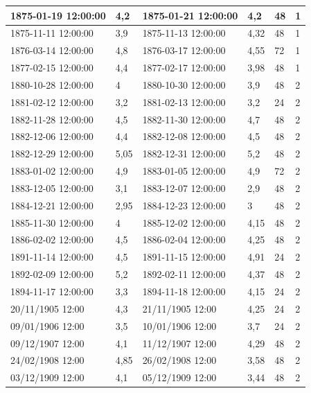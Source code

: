\documentclass[11pt]{article}
\begin{document}
\begin{longtable}{|l|p{2.3cm}|l|p{2.3cm}|l|l|}
        1875-01-19 12:00:00 & 4,2 & 1875-01-21 12:00:00 & 4,2 & 48 & 1 \\ \hline
        1875-11-11 12:00:00 & 3,9 & 1875-11-13 12:00:00 & 4,32 & 48 & 1 \\ \hline
        1876-03-14 12:00:00 & 4,8 & 1876-03-17 12:00:00 & 4,55 & 72 & 1 \\ \hline
        1877-02-15 12:00:00 & 4,4 & 1877-02-17 12:00:00 & 3,98 & 48 & 1 \\ \hline
        1880-10-28 12:00:00 & 4 & 1880-10-30 12:00:00 & 3,9 & 48 & 2 \\ \hline
        1881-02-12 12:00:00 & 3,2 & 1881-02-13 12:00:00 & 3,2 & 24 & 2 \\ \hline
        1882-11-28 12:00:00 & 4,5 & 1882-11-30 12:00:00 & 4,7 & 48 & 2 \\ \hline
        1882-12-06 12:00:00 & 4,4 & 1882-12-08 12:00:00 & 4,5 & 48 & 2 \\ \hline
        1882-12-29 12:00:00 & 5,05 & 1882-12-31 12:00:00 & 5,2 & 48 & 2 \\ \hline
        1883-01-02 12:00:00 & 4,9 & 1883-01-05 12:00:00 & 4,9 & 72 & 2 \\ \hline
        1883-12-05 12:00:00 & 3,1 & 1883-12-07 12:00:00 & 2,9 & 48 & 2 \\ \hline
        1884-12-21 12:00:00 & 2,95 & 1884-12-23 12:00:00 & 3 & 48 & 2 \\ \hline
        1885-11-30 12:00:00 & 4 & 1885-12-02 12:00:00 & 4,15 & 48 & 2 \\ \hline
        1886-02-02 12:00:00 & 4,5 & 1886-02-04 12:00:00 & 4,25 & 48 & 2 \\ \hline
        1891-11-14 12:00:00 & 4,5 & 1891-11-15 12:00:00 & 4,91 & 24 & 2 \\ \hline
        1892-02-09 12:00:00 & 5,2 & 1892-02-11 12:00:00 & 4,37 & 48 & 2 \\ \hline
        1894-11-17 12:00:00 & 3,3 & 1894-11-18 12:00:00 & 4,15 & 24 & 2 \\ \hline
        20/11/1905 12:00 & 4,3 & 21/11/1905 12:00 & 4,25 & 24 & 2 \\ \hline
        09/01/1906 12:00 & 3,5 & 10/01/1906 12:00 & 3,7 & 24 & 2 \\ \hline
        09/12/1907 12:00 & 4,1 & 11/12/1907 12:00 & 4,29 & 48 & 2 \\ \hline
        24/02/1908 12:00 & 4,85 & 26/02/1908 12:00 & 3,58 & 48 & 2 \\ \hline
        03/12/1909 12:00 & 4,1 & 05/12/1909 12:00 & 3,44 & 48 & 2 \\ \hline

\end{longtable}
\end{document}

